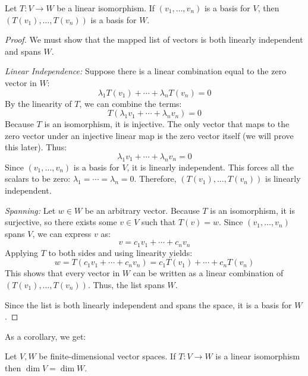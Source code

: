 \documentclass[../linear_algebra_and_groups.tex]{subfiles}
\begin{document}
\begin{proposition}
    \begin{shaded*}
        Let $T:V \to W$ be a linear isomorphism. If $(v_1, \dots, v_n)$ is a basis for $V$, then $(T(v_1), \dots, T(v_n))$ is a basis for $W$.
    \end{shaded*}
\end{proposition}
\begin{proof}
    We must show that the mapped list of vectors is both linearly independent and spans $W$.
    
    \textit{Linear Independence:} Suppose there is a linear combination equal to the zero vector in $W$:
    \[ \lambda_1 T(v_1) + \cdots + \lambda_n T(v_n) = 0 \]
    By the linearity of $T$, we can combine the terms:
    \[ T(\lambda_1 v_1 + \cdots + \lambda_n v_n) = 0 \]
    Because $T$ is an isomorphism, it is injective. The only vector that maps to the zero vector under an injective linear map is the zero vector itself (we will prove this later). Thus:
    \[ \lambda_1 v_1 + \cdots + \lambda_n v_n = 0 \]
    Since $(v_1, \dots, v_n)$ is a basis for $V$, it is linearly independent. This forces all the scalars to be zero: $\lambda_1 = \cdots = \lambda_n = 0$. Therefore, $(T(v_1), \dots, T(v_n))$ is linearly independent.
    
    \textit{Spanning:} Let $w \in W$ be an arbitrary vector. Because $T$ is an isomorphism, it is surjective, so there exists some $v \in V$ such that $T(v) = w$. Since $(v_1, \dots, v_n)$ spans $V$, we can express $v$ as:
    \[ v = c_1 v_1 + \cdots + c_n v_n \]
    Applying $T$ to both sides and using linearity yields:
    \[ w = T(c_1 v_1 + \cdots + c_n v_n) = c_1 T(v_1) + \cdots + c_n T(v_n) \]
    This shows that every vector in $W$ can be written as a linear combination of $(T(v_1), \dots, T(v_n))$. Thus, the list spans $W$. 
    
    Since the list is both linearly independent and spans the space, it is a basis for $W$.
    \qedhere
\end{proof}
As a corollary, we get:
\begin{corollary}
\label{cor:isodimequal}
    \begin{shaded*}
        Let $V,W$ be finite-dimensional vector spaces. If $T:V\to W$ is a linear isomorphism then $\dim V=\dim W$.
    \end{shaded*}
\end{corollary}
\end{document}
